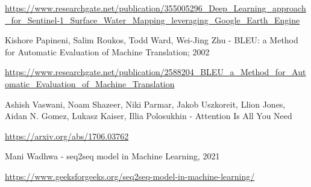 \documentclass[a4paper,12pt]{article}
\begin{document}
\begin{thebibliography}{}
{		\url{https://www.researchgate.net/publication/355005296_Deep_Learning_approach_for_Sentinel-1_Surface_Water_Mapping_leveraging_Google_Earth_Engine}
		
		 Kishore Papineni, Salim Roukos, Todd Ward, Wei-Jing Zhu - BLEU: a Method for Automatic Evaluation of Machine Translation; 2002
		
		\url{https://www.researchgate.net/publication/2588204_BLEU_a_Method_for_Automatic_Evaluation_of_Machine_Translation}
		
		 Ashish Vaswani, Noam Shazeer, Niki Parmar, Jakob Uszkoreit, Llion Jones, Aidan N. Gomez, Lukasz Kaiser, Illia Polosukhin - Attention Is All You Need
		
		\url{https://arxiv.org/abs/1706.03762}
		
		 Mani Wadhwa - seq2seq model in Machine Learning, 2021
		
		\url{https://www.geeksforgeeks.org/seq2seq-model-in-machine-learning/}
		}
	\end{thebibliography}
\end{document}
